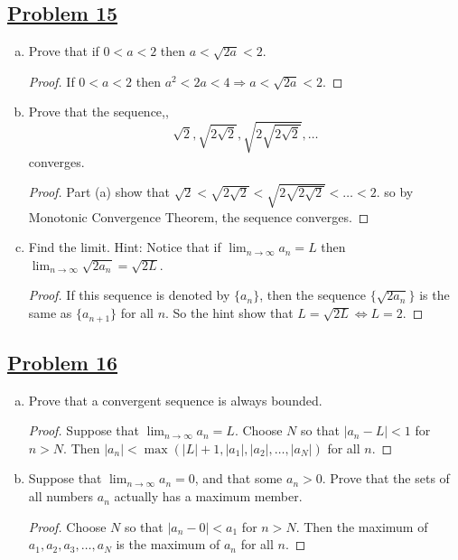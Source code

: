 \documentclass[10pt,letterpaper]{article}
\begin{document}
	\subsection*{{\color{purple}\underline{Problem 15}}}
	\begin{enumerate}[(a)]
		\item Prove that if $0 < a < 2$ then $a < \sqrt{2a} < 2$.
		\begin{proof}
			If $0 < a < 2$ then $a^2 < 2a < 4 \Rightarrow a < \sqrt{2a} < 2$.
		\end{proof}
		\item Prove that the sequence,,
		$$\sqrt{2}, \sqrt{2\sqrt{2}}, \sqrt{2\sqrt{2\sqrt{2}}}, \ldots$$
		converges.
		\begin{proof}
			Part (a) show that
			$\sqrt{2} < \sqrt{2\sqrt{2}} < \sqrt{2\sqrt{2\sqrt{2}}} < \ldots < 2$.
			so by Monotonic Convergence Theorem, the sequence converges. 
		\end{proof}
		\item Find the limit. Hint: Notice that if $\displaystyle\lim_{n\to \infty}a_n = L$
		then $\displaystyle\lim_{n\to \infty}\sqrt{2a_n} = \sqrt{2L}$.
		\begin{proof}
			If this sequence is denoted by $\{a_n\}$, then the sequence $\{\sqrt{2a_n}\}$ is
			the same as $\{a_{n+1}\}$ for all $n$. So the hint show that $L = \sqrt{2L} \Leftrightarrow L = 2$.
		\end{proof}
	\end{enumerate}
	
	\subsection*{{\color{purple}\underline{Problem 16}}}
	\begin{enumerate}[(a)]
		\item Prove that a convergent sequence is always bounded.
		\begin{proof}
			Suppose that $\displaystyle\lim_{n\to \infty}a_n = L$. Choose $N$ so that 
			$|a_n - L| < 1$ for $n > N$. Then $|a_n| < \max(|L| + 1, |a_1|, |a_2|, \ldots, |a_N|)$ for all $n$.
		\end{proof}
		\item Suppose that $\displaystyle\lim_{n\to \infty}a_n = 0$, and that some $a_n > 0$. Prove that
		the sets of all numbers $a_n$ actually has a maximum member.
		\begin{proof}
			Choose $N$ so that $|a_n - 0| < a_1$ for $n > N$. Then the maximum of $a_1, a_2, a_3, \ldots, a_N$
			is the maximum of $a_n$ for all $n$.
		\end{proof}
	\end{enumerate}
	
\end{document}
